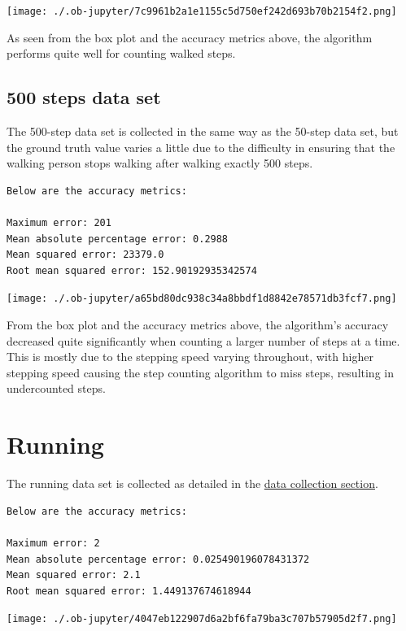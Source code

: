 \documentclass[12pt]{report}
\begin{document}
\begin{center}
\texttt{[image: ./.ob-jupyter/7c9961b2a1e1155c5d750ef242d693b70b2154f2.png]}
\end{center}

As seen from the box plot and the accuracy metrics above,
the algorithm performs quite well for counting walked steps.
\subsection{500 steps data set}
\label{sec:org3ff3efc}
The 500-step data set is collected in the same way as the 50-step
data set, but the ground truth value varies a little due to the
difficulty in ensuring that the walking person stops walking
after walking exactly 500 steps.
\label{org923d629}
\begin{verbatim}
Below are the accuracy metrics:

Maximum error: 201
Mean absolute percentage error: 0.2988
Mean squared error: 23379.0
Root mean squared error: 152.90192935342574
\end{verbatim}

\begin{center}
\texttt{[image: ./.ob-jupyter/a65bd80dc938c34a8bbdf1d8842e78571db3fcf7.png]}
\end{center}

From the box plot and the accuracy metrics above, the algorithm's
accuracy decreased quite significantly when counting a larger
number of steps at a time. This is mostly due to the stepping
speed varying throughout, with higher stepping speed causing the
step counting algorithm to miss steps,
resulting in undercounted steps.
\section{Running}
\label{sec:org6134095}
The running data set is collected as detailed in the
\hyperref[orgdcbbb87]{data collection section}.
\label{org84c5160}
\begin{verbatim}
Below are the accuracy metrics:

Maximum error: 2
Mean absolute percentage error: 0.025490196078431372
Mean squared error: 2.1
Root mean squared error: 1.449137674618944
\end{verbatim}

\begin{center}
\texttt{[image: ./.ob-jupyter/4047eb122907d6a2bf6fa79ba3c707b57905d2f7.png]}
\end{center}
\end{document}
